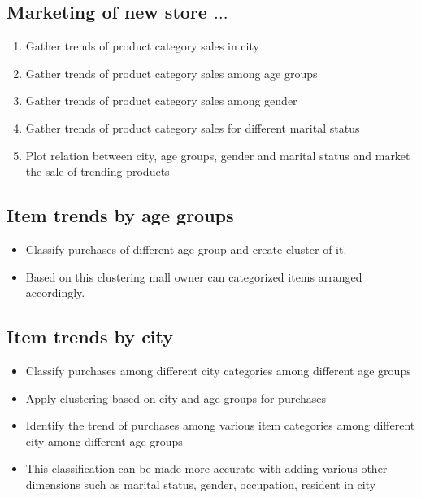 \documentclass[paper=letter, fontsize=12pt]{article}
\begin{document}
\subsection{Marketing of new store $ \dots $}
\begin{enumerate}
	\item Gather trends of product category sales in city
	\item Gather trends of product category sales among age groups
	\item Gather trends of product category sales among gender
	\item Gather trends of product category sales for different marital status
	\item Plot relation between city, age groups, gender and marital status and market the sale of trending products
\end{enumerate}

\subsection{Item trends by age groups}
\begin{itemize}
	\item Classify purchases of different age group and create cluster of it.
	\item[] Based on this clustering mall owner can categorized items arranged accordingly. 
\end{itemize}

\subsection{Item trends by city}
\begin{itemize}
	\item Classify purchases among different city categories among different age groups
	\item Apply clustering based on city and age groups for purchases 
	\item Identify the trend of purchases among various item categories among different city among different age groups
	\item[] This classification can be made more accurate with adding various other dimensions such as marital status, gender, occupation, resident in city
\end{itemize}
\end{document}
